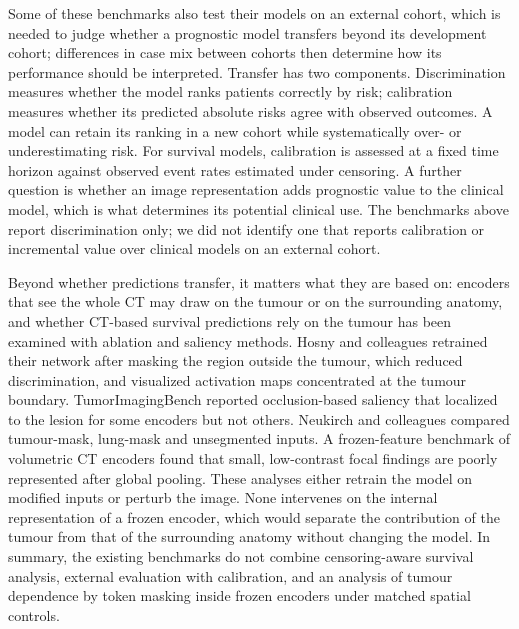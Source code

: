 Some of these benchmarks also test their models on an external cohort, which is needed to judge whether a prognostic model transfers beyond its development cohort; differences in case mix between cohorts then determine how its performance should be interpreted.\cite{debray2015,collins2024} Transfer has two components. Discrimination measures whether the model ranks patients correctly by risk; calibration measures whether its predicted absolute risks agree with observed outcomes. A model can retain its ranking in a new cohort while systematically over- or underestimating risk.\cite{vancalster2019} For survival models, calibration is assessed at a fixed time horizon against observed event rates estimated under censoring.\cite{austin2020} A further question is whether an image representation adds prognostic value to the clinical model, which is what determines its potential clinical use. The benchmarks above report discrimination only; we did not identify one that reports calibration or incremental value over clinical models on an external cohort.

Beyond whether predictions transfer, it matters what they are based on: encoders that see the whole CT may draw on the tumour or on the surrounding anatomy, and whether CT-based survival predictions rely on the tumour has been examined with ablation and saliency methods. Hosny and colleagues retrained their network after masking the region outside the tumour, which reduced discrimination, and visualized activation maps concentrated at the tumour boundary.\cite{hosny2018} TumorImagingBench reported occlusion-based saliency that localized to the lesion for some encoders but not others.\cite{aerts2025tib} Neukirch and colleagues compared tumour-mask, lung-mask and unsegmented inputs.\cite{neukirch2026} A frozen-feature benchmark of volumetric CT encoders found that small, low-contrast focal findings are poorly represented after global pooling.\cite{chevli2026} These analyses either retrain the model on modified inputs or perturb the image. None intervenes on the internal representation of a frozen encoder, which would separate the contribution of the tumour from that of the surrounding anatomy without changing the model. In summary, the existing benchmarks do not combine censoring-aware survival analysis, external evaluation with calibration, and an analysis of tumour dependence by token masking inside frozen encoders under matched spatial controls.

